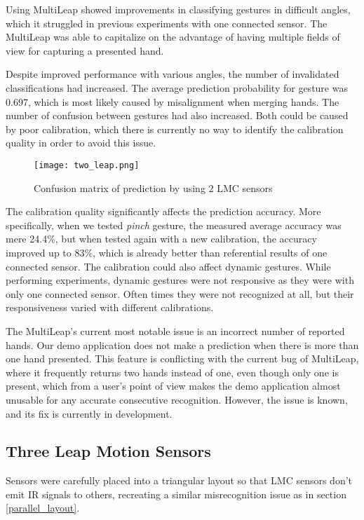 Using MultiLeap \cite{tomasMultileap} showed improvements in classifying gestures in difficult angles, which it struggled in previous experiments with one connected sensor. The MultiLeap was able to capitalize on the advantage of having multiple fields of view for capturing a presented hand.

Despite improved performance with various angles, the number of invalidated classifications had increased. The average prediction probability for gesture was 0.697, which is most likely caused by misalignment when merging hands. The number of confusion between gestures had also increased. Both could be caused by poor calibration, which there is currently no way to identify the calibration quality in order to avoid this issue. 

\begin{figure}[ht]
    \centering
    \texttt{[image: two\_leap.png]}
    \caption{Confusion matrix of prediction by using 2 LMC sensors}
    \label{fig:confuse_2}
\end{figure}

The calibration quality significantly affects the prediction accuracy. More specifically, when we tested \textit{pinch} gesture, the measured average accuracy was mere 24.4\%, but when tested again with a new calibration, the accuracy improved up to 83\%, which is already better than referential results of one connected sensor. The calibration could also affect dynamic gestures. While performing experiments, dynamic gestures were not responsive as they were with only one connected sensor. Often times they were not recognized at all, but their responsiveness varied with different calibrations. 

The MultiLeap's current most notable issue is an incorrect number of reported hands. Our demo application does not make a prediction when there is more than one hand presented. This feature is conflicting with the current bug of MultiLeap, where it frequently returns two hands instead of one, even though only one is present, which from a user's point of view makes the demo application almost unusable for any accurate consecutive recognition. However, the issue is known, and its fix is currently in development.

\subsection{Three Leap Motion Sensors}

Sensors were carefully placed into a triangular layout so that LMC sensors don't emit IR signals to others, recreating a similar misrecognition issue as in section \ref{parallel_layout}.

